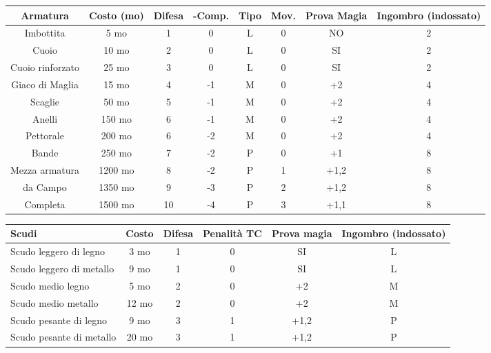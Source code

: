\documentclass[landscape,10pt,a4paper]{article}
\begin{document}
\begin{multicols}{2}
	
	\begin{tabular}{cccccccc}
		\textbf{Armatura} & \textbf{Costo (mo)} & \textbf{Difesa} & \textbf{-Comp.} &  \textbf{Tipo} & \textbf{Mov.} & \textbf{Prova Magia}&\textbf{Ingombro (indossato)}\\
		\hline
		Imbottita & 5 mo & 1 & 0 & L & 0 & NO&2\\
		Cuoio & 10 mo & 2 & 0  & L & 0 & SI&2\\
		Cuoio rinforzato& 25 mo  & 3  & 0   & L & 0 & SI&2\\
		Giaco di Maglia & 15 mo & 4  & -1  & M & 0 &+2&4\\
		Scaglie& 50 mo & 5  & -1  & M & 0 &+2&4\\
		Anelli & 150 mo & 6  & -1  & M & 0 &+2&4\\
		Pettorale  & 200 mo & 6  & -2  & M & 0 &+2&4\\
		Bande & 250 mo & 7  & -2  & P & 0 &+1&8\\
		Mezza armatura  & 1200 mo& 8  & -2  & P & 1 &+1,2&8\\
		da Campo& 1350 mo& 9  & -3  & P & 2 &+1,2&8\\
		Completa& 1500 mo& 10 & -4  & P & 3 &+1,1&8\\
	\end{tabular}
	
	
	
	\begin{tabular}{lccccc}
		\textbf{Scudi} & \textbf{Costo} & \textbf{Difesa} & \textbf{Penalità TC} & \textbf{Prova magia} &  \textbf{Ingombro (indossato)}\\
		\hline
		Scudo leggero di legno 	 & 	3 mo  	&  1	& 0& SI	  	& L\\
		Scudo leggero di metallo & 	9 mo  	&  1	& 0& SI	  	& L\\
		Scudo medio legno		 &	5 mo 	&  2	& 0& +2		& M\\
		Scudo medio metallo	 	 &	12 mo  	&  2  	& 0& +2  	& M\\
		Scudo pesante di legno   & 	9  mo  	&  3 	& 1& +1,2  	& P\\
		Scudo pesante di metallo & 	20 mo  	&  3	& 1& +1,2  	& P\\
	\end{tabular}
	
		\begin{dmbox}[title=Condizioni]
		
		
		

\end{dmbox}
\end{multicols}
\end{document}

